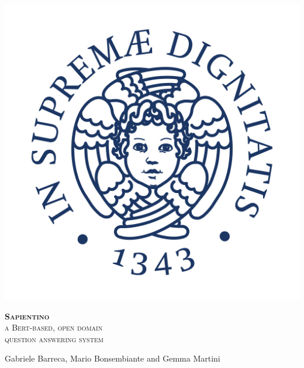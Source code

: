 \documentclass[10pt,hidelinks]{article}
\newcommand\nomefico{\textbf{Sapientino}}
\begin{document}
\begin{titlepage}
    \centering
    \scalebox{0.8} {
        \begin{minipage}{0.22\textwidth}%
            \includegraphics[width=\linewidth]{pics/Cherubino.jpg}
        \end{minipage}\hspace{10pt}
        \begin{minipage}{0.9\textwidth}%
            \flushright
            \large
            \vspace{0.8cm}
            \textsc{\color{pblue}%
            \nomefico\\
            a Bert-based, open domain\\
            question answering system}
        \end{minipage}%
    }

    \vspace{0.3cm}
    
    Gabriele Barreca, Mario Bonsembiante {\small and} Gemma Martini
    
    

\end{titlepage}
\end{document}
